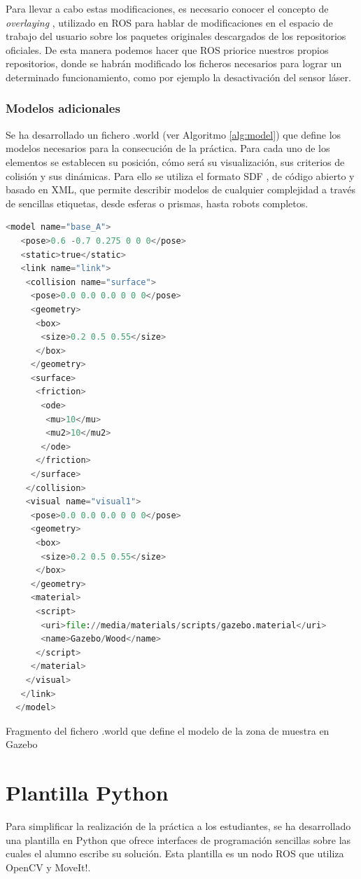 \documentclass[12pt,spanish,chapterprefix, numbers=noenddot]{book}
\numberwithin{equation}{section}
\numberwithin{figure}{section}
\begin{document}
Para llevar a cabo estas modificaciones, es necesario conocer el concepto de \textit{overlaying} \cite{overlaying}, utilizado en ROS para hablar de modificaciones en el espacio de trabajo \cite{wstool} del usuario sobre los paquetes originales descargados de los repositorios oficiales. De esta manera podemos hacer que ROS priorice nuestros propios repositorios, donde se habrán modificado los ficheros necesarios para lograr un determinado funcionamiento, como por ejemplo la desactivación del sensor láser.

\subsubsection{Modelos adicionales}
Se ha desarrollado un fichero .world (ver Algoritmo \ref{alg:model}) que define los modelos necesarios para la consecución de la práctica. Para cada uno de los elementos se establecen su posición, cómo será su visualización, sus criterios de colisión y sus dinámicas. 
Para ello se utiliza el formato SDF \cite{sdf_format}, de código abierto y basado en XML, que permite describir modelos de cualquier complejidad a través de sencillas etiquetas, desde esferas o prismas, hasta robots completos.

\vspace{20pt}
\begin{algorithm}[htbp!]
	\begin{lstlisting}[breaklines=true,language=python]  
  <model name="base_A">
   <pose>0.6 -0.7 0.275 0 0 0</pose>
   <static>true</static>
   <link name="link">
    <collision name="surface">
     <pose>0.0 0.0 0.0 0 0 0</pose>
     <geometry>
      <box>
       <size>0.2 0.5 0.55</size>
      </box>
     </geometry>
     <surface>
      <friction>
       <ode>
        <mu>10</mu>
        <mu2>10</mu2>
       </ode>
      </friction>
     </surface>
    </collision>
    <visual name="visual1">
     <pose>0.0 0.0 0.0 0 0 0</pose>
     <geometry>
      <box>
       <size>0.2 0.5 0.55</size>
      </box>
     </geometry>
     <material>
      <script>
       <uri>file://media/materials/scripts/gazebo.material</uri>
       <name>Gazebo/Wood</name>
      </script>
     </material>
    </visual>
   </link>
  </model>
	\end{lstlisting}
\caption{\label{alg:model}Fragmento del fichero .world que define el modelo de la zona de muestra en Gazebo}
\end{algorithm}

\section{Plantilla Python}\label{sec:plantilla}
Para simplificar la realización de la práctica a los estudiantes, se ha desarrollado una plantilla en Python que ofrece interfaces de programación sencillas sobre las cuales el alumno escribe su solución. Esta plantilla es un nodo ROS que utiliza OpenCV y MoveIt!. 
\end{document}

